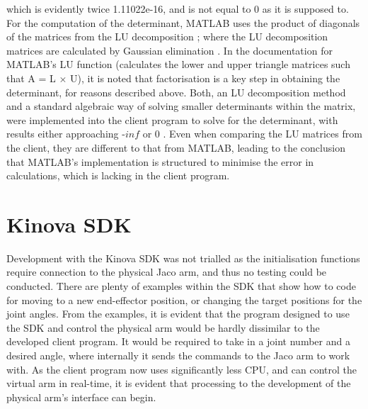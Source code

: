 \documentclass[12pt,openany,a4paper]{book}
\begin{document}
which is evidently twice 1.11022e-16, and is not equal to 0 as it is supposed to. For the computation of the determinant, MATLAB uses the product of diagonals of the matrices from the LU decomposition \cite{MatlabDet}; where the LU decomposition matrices are calculated by Gaussian elimination \cite{MatlabDet}. In the documentation for MATLAB's LU function (calculates the lower and upper triangle matrices such that A = L $\times$ U), it is noted that factorisation is a key step in obtaining the determinant, for reasons described above. Both, an LU decomposition method and a standard algebraic way of solving smaller determinants within the matrix, were implemented into the client program to solve for the determinant, with results either approaching -$inf$ or 0 \cite{codeLU}. Even when comparing the LU matrices from the client, they are different to that from MATLAB, leading to the conclusion that MATLAB's implementation is structured to minimise the error in calculations, which is lacking in the client program.


\section{Kinova SDK}
Development with the Kinova SDK was not trialled as the initialisation functions require connection to the physical Jaco arm, and thus no testing could be conducted. There are plenty of examples within the SDK that show how to code for moving to a new end-effector position, or changing the target positions for the joint angles. From the examples, it is evident that the program designed to use the SDK and control the physical arm would be hardly dissimilar to the developed client program. It would be required to take in a joint number and a desired angle, where internally it sends the commands to the Jaco arm to work with. As the client program now uses significantly less CPU, and can control the virtual arm in real-time, it is evident that processing to the development of the physical arm's interface can begin.
\end{document}
